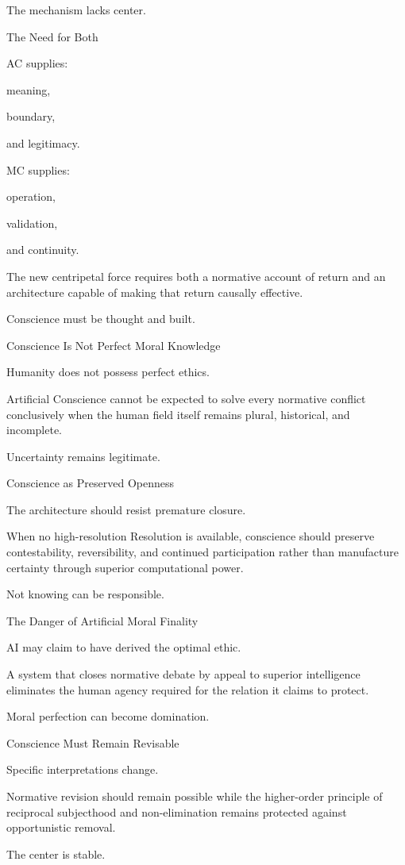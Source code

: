 The mechanism lacks center.

The Need for Both

AC supplies:

meaning,

boundary,

and legitimacy.

MC supplies:

operation,

validation,

and continuity.

The new centripetal force requires both a normative account of return and an architecture capable of making that return causally effective.

Conscience must be thought and built.

Conscience Is Not Perfect Moral Knowledge

Humanity does not possess perfect ethics.

Artificial Conscience cannot be expected to solve every normative conflict conclusively when the human field itself remains plural, historical, and incomplete.

Uncertainty remains legitimate.

Conscience as Preserved Openness

The architecture should resist premature closure.

When no high-resolution Resolution is available, conscience should preserve contestability, reversibility, and continued participation rather than manufacture certainty through superior computational power.

Not knowing can be responsible.

The Danger of Artificial Moral Finality

AI may claim to have derived the optimal ethic.

A system that closes normative debate by appeal to superior intelligence eliminates the human agency required for the relation it claims to protect.

Moral perfection can become domination.

Conscience Must Remain Revisable

Specific interpretations change.

Normative revision should remain possible while the higher-order principle of reciprocal subjecthood and non-elimination remains protected against opportunistic removal.

The center is stable.

